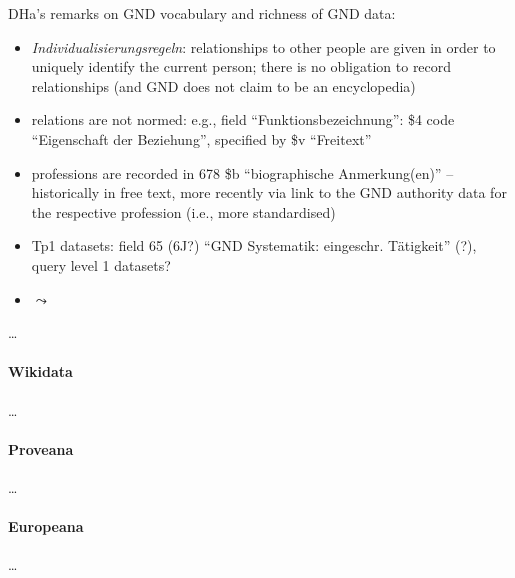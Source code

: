 


DHa's remarks on GND vocabulary and richness of GND data:
%
\begin{itemize}
  \item
    \emph{Individualisierungsregeln}: relationships to other people are given in order to uniquely
    identify the current person; there is no obligation to record relationships
    (and GND does not claim to be an encyclopedia)
  \item
    relations are not normed:
    e.g., field \enquote{Funktionsbezeichnung}: \$4 code \enquote{Eigenschaft der Beziehung},
    specified by \$v \enquote{Freitext}
  \item
    professions are recorded in 678 \$b \enquote{biographische Anmerkung(en)} --
    historically in free text,
    more recently via link to the GND authority data for the respective profession (i.e., more standardised)
  \item
    Tp1 datasets: field 65 (6J?) \enquote{GND Systematik: eingeschr. Tätigkeit} (?),
    query level 1 datasets?
  \item
    $\leadsto$ 
\end{itemize}


\dots


\paragraph{Wikidata}

\dots

\paragraph{Proveana}

\dots

\paragraph{Europeana}

\dots

\par\bigskip
{}

